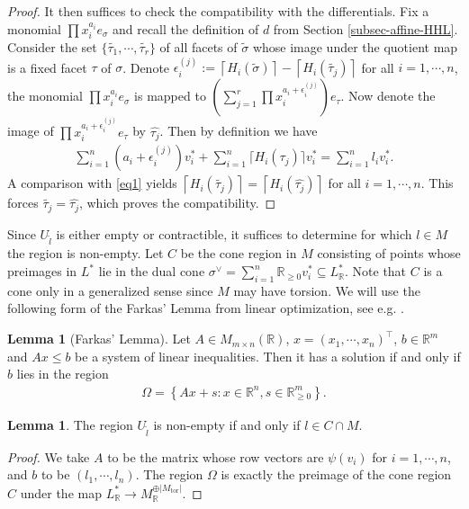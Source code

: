 \documentclass[11pt,reqno]{amsart}
\def\R {{\mathbb R}}
\theoremstyle{definition}
\newtheorem{lemma}[theorem]{Lemma}
\numberwithin{equation}{section}
\begin{document}
\begin{proof}
    It then suffices to check the compatibility with the differentials. Fix a monomial $\prod x_i^{a_i} e_{\sigma}$ and recall the definition of $d$ from Section \ref{subsec-affine-HHL}. Consider the set $\{\widetilde{\tau_1},\cdots,\widetilde{\tau_r}\}$ of all facets of $\widetilde{\sigma}$ whose image under the quotient map is a fixed facet $\tau$ of $\sigma$. Denote $\epsilon_{i}^{(j)}:=\left\lceil H_{i}(\widetilde{\sigma})  \right\rceil - \left\lceil H_{i}(\widetilde{\tau_j})  \right\rceil $ for all $i=1,\cdots,n$, the monomial $\prod x_i^{a_i} e_{\sigma}$ is mapped to $\left(\sum_{j=1}^r \prod x_i^{a_i+\epsilon_{i}^{(j)}}\right) e_{\tau}$. Now denote the image of $\prod x_i^{a_i+\epsilon_{i}^{(j)}}e_{\tau}$ by $\widehat{\tau_j}$. Then by definition we have
    \begin{align*}
        \sum_{i=1}^n (a_i +\epsilon_{i}^{(j)} )v_i^* + \sum_{i=1}^n \lceil H_i(\widehat{\tau_j}) \rceil v_i^* = \sum_{i=1}^n l_i v_i^*.
    \end{align*}
    A comparison with \eqref{eq1} yields $\left\lceil H_{i}(\widetilde{\tau_j})  \right\rceil = \left\lceil H_{i}(\widehat{\tau_j})  \right\rceil$ for all $i=1,\cdots,n$. This forces $\widetilde{\tau_j} = \widehat{\tau_j}$, which proves the compatibility.
\end{proof}



Since $U_{\widetilde{l}}$ is either empty or contractible, it suffices to determine for which $l\in M$ the region is non-empty. Let $C$ be the cone region in $M$ consisting of points whose preimages in $L^*$ lie in the dual cone $\sigma^{\vee}=\sum_{i=1}^n \R_{\geq 0}v_i^*\subseteq L^*_{\R}$. Note that $C$ is a cone only in a generalized sense since $M$ may have torsion. We will use the following form of the Farkas' Lemma from linear optimization, see e.g. \cite[Example 2.26]{BV}.

\begin{lemma}[Farkas' Lemma]\label{lem-farkas}
    Let $A\in M_{m\times n}(\R)$, $x=(x_1,\cdots,x_n)^{\top}$, $b\in\R^m$ and $Ax\leq b$ be a system of linear inequalities. Then it has a solution if and only if $b$ lies in the region
    \begin{align*}
        \Omega = \left\{Ax+s: x\in\R^n, s\in \R^m_{\geq 0}\right\}.
    \end{align*}
\end{lemma}

\begin{lemma}\label{lem-criterion-for-nonempty}
    The region $U_{\widetilde{l}}$ is non-empty if and only if $l\in C\cap M$.
\end{lemma}
\begin{proof}
    We take $A$ to be the matrix whose row vectors are $\psi(v_i)$ for $i=1,\cdots,n$, and $b$ to be $(l_1,\cdots,l_n)$. The region $\Omega$ is exactly the preimage of the cone region $C$ under the map $L^*_{\R}\rightarrow M_{\R}^{\oplus |M_{\mathrm{tor}}|}$.
\end{proof}
\end{document}
